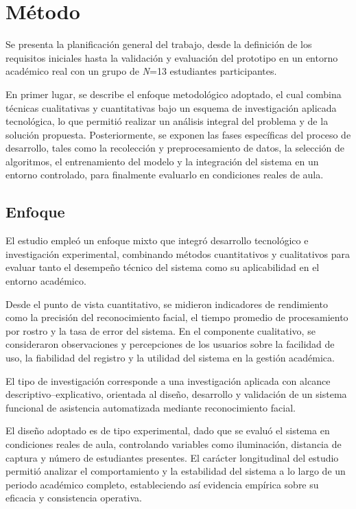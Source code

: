 \fancyhead{}
\fancyfoot{}
\cfoot{\thepage}



\chapter{Método}

Se presenta la planificación general del trabajo, desde la definición de los requisitos iniciales hasta la validación y evaluación del prototipo en un entorno académico real con un grupo de \textit{N}=13 estudiantes participantes.

En primer lugar, se describe el enfoque metodológico adoptado, el cual combina técnicas cualitativas y cuantitativas bajo un esquema de investigación aplicada tecnológica, lo que permitió realizar un análisis integral del problema y de la solución propuesta. Posteriormente, se exponen las fases específicas del proceso de desarrollo, tales como la recolección y preprocesamiento de datos, la selección de algoritmos, el entrenamiento del modelo y la integración del sistema en un entorno controlado, para finalmente evaluarlo en condiciones reales de aula.


\section{Enfoque}

El estudio empleó un enfoque mixto que integró desarrollo tecnológico e investigación experimental, combinando métodos cuantitativos y cualitativos para evaluar tanto el desempeño técnico del sistema como su aplicabilidad en el entorno académico. 

Desde el punto de vista cuantitativo, se midieron indicadores de rendimiento como la precisión del reconocimiento facial, el tiempo promedio de procesamiento por rostro y la tasa de error del sistema. En el componente cualitativo, se consideraron observaciones y percepciones de los usuarios sobre la facilidad de uso, la fiabilidad del registro y la utilidad del sistema en la gestión académica.

El tipo de investigación corresponde a una investigación aplicada con alcance descriptivo–explicativo, orientada al diseño, desarrollo y validación de un sistema funcional de asistencia automatizada mediante reconocimiento facial. 

El diseño adoptado es de tipo experimental, dado que se evaluó el sistema en condiciones reales de aula, controlando variables como iluminación, distancia de captura y número de estudiantes presentes. El carácter longitudinal del estudio permitió analizar el comportamiento y la estabilidad del sistema a lo largo de un periodo académico completo, estableciendo así evidencia empírica sobre su eficacia y consistencia operativa.


